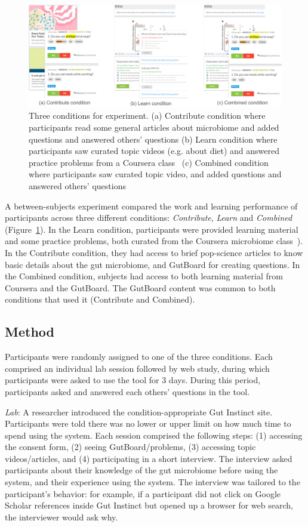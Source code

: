 \begin{figure}[h]
  \centering
  \includegraphics[width=1.0\textwidth]{figures/gutinstinct/gi-6.png}
  \caption[Three conditions for experiment]
{Three conditions for experiment. (a) Contribute condition where participants read some general articles about microbiome and added questions and answered others’ questions (b) Learn condition where participants saw curated topic videos (e.g. about diet) and answered practice problems from a Coursera class~\cite{Knight2016} (c) Combined condition where participants saw curated topic video, and added questions and answered others’ questions }
  \label{fig:gi-6}
\end{figure}

A between-subjects experiment compared the work and learning performance of participants across three different conditions: \textit{Contribute}, \textit{Learn} and \textit{Combined} (Figure~\ref{fig:gi-6}). In the Learn condition, participants were provided learning material and some practice problems, both curated from the Coursera microbiome class~\cite{Knight2016}). In the Contribute condition, they had access to brief pop-science articles to know basic details about the gut microbiome, and GutBoard for creating questions. In the Combined condition, subjects had access to both learning material from Coursera and the GutBoard. The GutBoard content was common to both conditions that used it (Contribute and Combined).

\subsection*{Method}
Participants were randomly assigned to one of the three conditions. Each comprised an individual lab session followed by web study, during which participants were asked to use the tool for 3 days. During this period, participants asked and answered each others’ questions in the tool.

\textit{Lab}: A researcher introduced the condition-appropriate Gut Instinct site. Participants were told there was no lower or upper limit on how much time to spend using the system. Each session comprised the following steps: (1) accessing the consent form, (2) seeing GutBoard/problems, (3) accessing topic videos/articles, and (4) participating in a short interview. The interview asked participants about their knowledge of the gut microbiome before using the system, and their experience using the system. The interview was tailored to the participant’s behavior: for example, if a participant did not click on Google Scholar references inside Gut Instinct but opened up a browser for web search, the interviewer would ask why.
 
